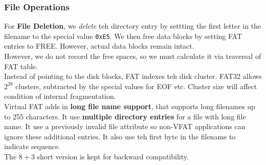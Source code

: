 \documentclass[12pt]{article}
\theoremstyle{definition}
\begin{document}
\subsubsection{File Operations}
For \textbf{File Deletion}, we \textit{delete} teh directory entry by settting the first letter in the filename to the special value \texttt{0xE5}. We then free data blocks by setting FAT entries to FREE. However, actual data blocks remain intact.\\
However, we do not record the free spaces, so we must calculate it via traversal of FAT table.\\
Instead of pointing to the disk blocks, FAT indexes teh disk cluster. FAT32 allows $2^28$ clusters, subtracted by the special values for EOF etc. Cluster size will affect condition of internal fragmentation.\\
Virtual FAT adds in \textbf{long file name support}, that supports long filenames up to 255 characters. It use \textbf{multiple directory entries} for a file with long file name. It use a previously invalid file attribute so non-VFAT applications can ignore these additional entries. It also use teh first byte in the filename to indicate sequence.\\
The $8+3$ short version is kept for backward compatibility.
\end{document}
